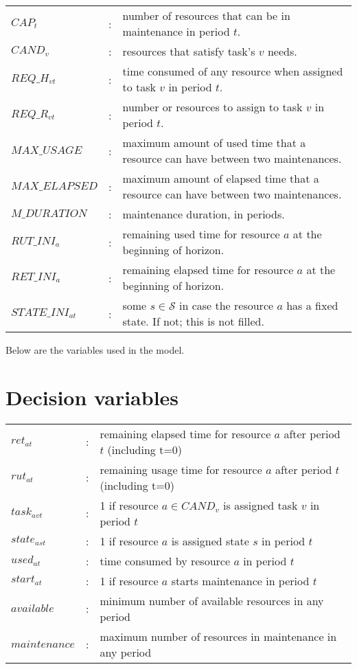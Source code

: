 \documentclass{roadef}
\begin{document}
    \begin{tabular}{p{30mm}lp{90mm}}
    $CAP_t$                 & : & number of resources that can be in maintenance in period $t$. \\
    $CAND_v$                & : & resources that satisfy task's $v$ needs. \\
    $REQ\_H_{vt}$           & : & time consumed of any resource when assigned to task $v$ in period $t$. \\
    $REQ\_R_{vt}$           & : & number or resources to assign to task $v$ in period $t$. \\            
    $MAX\_USAGE$            & : & maximum amount of used time that a resource can have between two maintenances. \\    
    $MAX\_ELAPSED$          & : & maximum amount of elapsed time that a resource can have between two maintenances. \\    
    $M\_DURATION$           & : & maintenance duration, in periods. \\        
    $RUT\_INI_a$            & : & remaining used time for resource $a$ at the beginning of horizon. \\        
    $RET\_INI_a$            & : & remaining elapsed time for resource $a$ at the beginning of horizon. \\
    $STATE\_INI_{at}$       & : & some $s \in \mathcal{S}$ in case the resource $a$ has a fixed state. If not; this is not filled. \\
    \end{tabular}
    \bigskip

    Below are the variables used in the model.

    \section{Decision variables}

    \begin{tabular}{p{30mm}lp{90mm}}
        $ret_{at}$      & : & remaining elapsed time for resource $a$ after period $t$ (including t=0) \\  
        $rut_{at}$      & : & remaining usage time for resource $a$ after period $t$ (including t=0) \\  
        $task_{avt}$    & : & 1 if resource $a \in CAND_v$ is assigned task $v$ in period $t$ \\  
        $state_{ast}$   & : & 1 if resource $a$ is assigned state $s$ in period $t$ \\  
        $used_{at}$     & : & time consumed by resource $a$ in period $t$ \\
        $start_{at}$    & : & 1 if resource $a$ starts maintenance in period $t$ \\
        $available$     & : & minimum number of available resources in any period \\
        $maintenance$   & : & maximum number of resources in maintenance in any period \\
    \end{tabular}
    \bigskip
\end{document}
